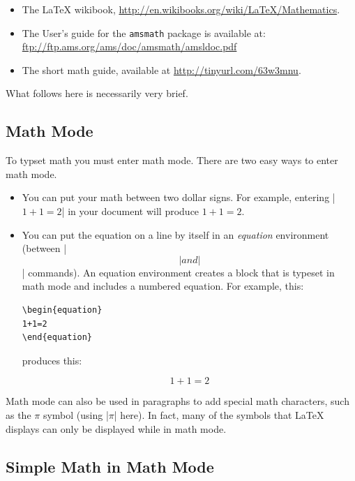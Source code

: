 \begin{itemize}
\item The \LaTeX{} wikibook,
  \url{http://en.wikibooks.org/wiki/LaTeX/Mathematics}.  
\item The User's guide for the \texttt{amsmath} package is available at:
\url{ftp://ftp.ams.org/ams/doc/amsmath/amsldoc.pdf}
\item The short math guide, available at
  \url{http://tinyurl.com/63w3mnu}.
\end{itemize}

What follows here is necessarily very brief. 

\subsection{Math Mode}
To typset math you must enter math mode. There are two easy ways to
enter math mode. 

\begin{itemize}
\item You can put your math between two dollar signs. For example,
  entering |$1+1=2$| in your document will produce $1+1=2$.
\item You can put the equation on a line by itself in an \emph{equation}
  environment (\eg between |\begin{equation}| and |\end{equation}|
  commands). An equation environment creates a block that is typeset in
  math mode and includes a numbered equation. For example, this:
\begin{Verbatim}
\begin{equation}
1+1=2
\end{equation}
\end{Verbatim}

produces this:

\begin{equation}
1+1=2
\end{equation}
\end{itemize}

Math mode can also be used in paragraphs to add special math characters, such
as the $\pi$ symbol (using |$\pi$| here).  In fact, many of the symbols that
\LaTeX{} displays can only be displayed while in math mode.

\subsection{Simple Math in Math Mode}

